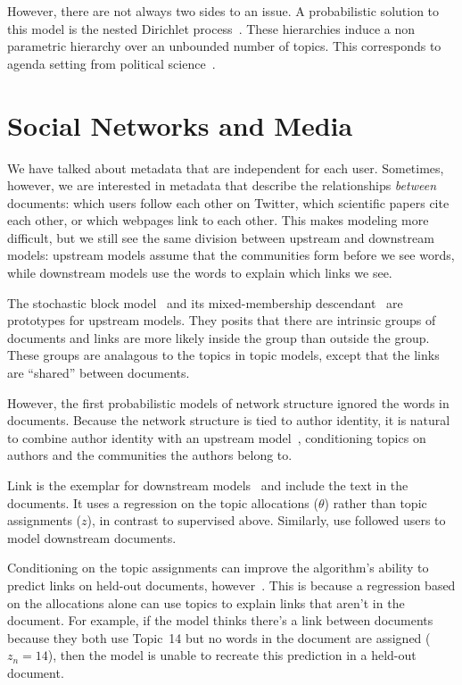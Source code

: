 
However, there are not always two sides to an issue.  A probabilistic
solution to this model is the nested Dirichlet
process~\citep{blei-07}.  These hierarchies induce a non parametric
hierarchy over an unbounded number of topics.  This corresponds to
agenda setting from political
science~\citep{Nguyen:Boyd-Graber:Resnik:Miler-2015}.



\section{Social Networks and Media}

We have talked about metadata that are independent for each user.
Sometimes, however, we are interested in metadata that describe the
relationships \emph{between} documents: which users follow each other
on Twitter, which scientific papers cite each other, or which webpages
link to each other.  This makes modeling more difficult, but we still
see the same division between upstream and downstream models: upstream
models assume that the communities form before we see words, while
downstream models use the words to explain which links we see.

The stochastic block model~\citep{holland-83} and its mixed-membership
descendant~\citep{airoldi-08} are prototypes for upstream models.
They posits that there are intrinsic groups of documents and links are
more likely inside the group than outside the group.  These groups are
analagous to the topics in topic models, except that the links are
``shared'' between documents.

However, the first probabilistic models of network structure ignored
the words in documents.  Because the network structure is tied to
author identity, it is natural to combine author identity with
an upstream model~\citet{mccallum-05b,liu-09}, conditioning topics on
authors and the communities the authors belong to.

Link  is the exemplar for downstream
models~\citep{nallapati-08} and include the text in the documents.  It
uses a regression on the topic allocations ($\theta$) rather than
topic assignments ($z$), in contrast to supervised  above.  Similarly, \citet{cha-12} use
followed users to model downstream documents.

Conditioning on the topic assignments can improve the algorithm's
ability to predict links on held-out documents,
however~\citep{chang-09a}.  This is because a regression based on the
allocations alone can use topics to explain links that aren't in the
document.  For example, if the model thinks there's a link between
documents because they both use Topic~14 but no words in the document
are assigned ($z_n=14$), then the model is unable to recreate this
prediction in a held-out document.  

